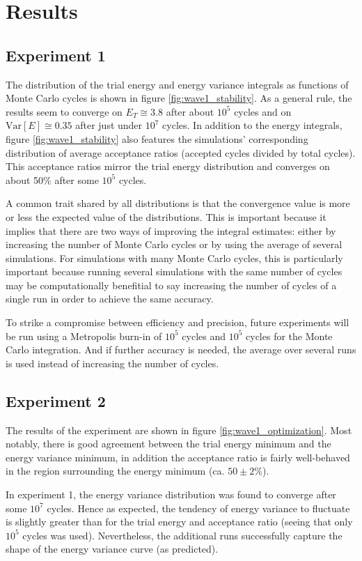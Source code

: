 \documentclass[nofootinbib,reprint,english]{revtex4-1}
\begin{document}
\section{Results}
\subsection{Experiment 1}
The distribution of the trial energy and energy variance integrals as functions of Monte Carlo cycles is shown in figure \ref{fig:wave1_stability}. As a general rule, the results seem to converge on \(E_T\cong3.8\) after about \(10^5\) cycles and on \(\text{Var}[E]\cong0.35\) after just under \(10^7\) cycles. In addition to the energy integrals, figure \ref{fig:wave1_stability} also features the simulations' corresponding distribution of average acceptance ratios (accepted cycles divided by total cycles). This acceptance ratios mirror the trial energy distribution and converges on about 50\% after some \(10^5\) cycles.

A common trait shared by all distributions is that the convergence value is more or less the expected value of the distributions. This is important because it implies that there are two ways of improving the integral estimates: either by increasing the number of Monte Carlo cycles or by using the average of several simulations. For simulations with many Monte Carlo cycles, this is particularly important because running several simulations with the same number of cycles may be computationally benefitial to say increasing the number of cycles of a single run in order to achieve the same accuracy.

To strike a compromise between efficiency and precision, future experiments will be run using a Metropolis burn-in of \(10^5\) cycles and \(10^5\) cycles for the Monte Carlo integration. And if further accuracy is needed, the average over several runs is used instead of increasing the number of cycles.

\subsection{Experiment 2}
The results of the experiment are shown in figure \ref{fig:wave1_optimization}. Most notably, there is good agreement between the trial energy minimum and the energy variance minimum, in addition the acceptance ratio is fairly well-behaved in the region surrounding the energy minimum (ca. \(50\pm2\)\%).

In experiment 1, the energy variance distribution was found to converge after some \(10^7\) cycles. Hence as expected, the tendency of energy variance to fluctuate is slightly greater than for the trial energy and acceptance ratio (seeing that only \(10^5\) cycles was used). Nevertheless, the additional runs successfully capture the shape of the energy variance curve (as predicted).
\end{document}
